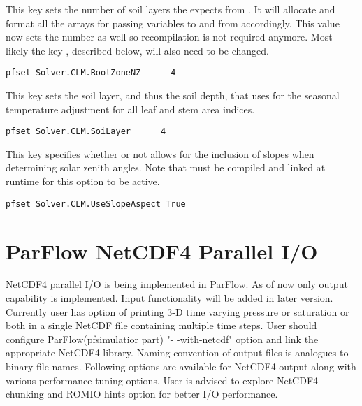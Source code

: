 {This key sets the number of soil layers the \parflow{} expects from
  .  It will allocate and format all the arrays for passing
  variables to and from  accordingly.  This value now sets
  the  number as well so recompilation is not required anymore.
  Most likely the key , described
  below, will also need to be changed.}
\begin{display}\begin{verbatim}
pfset Solver.CLM.RootZoneNZ      4
\end{verbatim}\end{display}

{This key sets the soil layer, and thus the soil depth, that  uses for the seasonal temperature adjustment for all leaf and stem area indices.}
\begin{display}\begin{verbatim}
pfset Solver.CLM.SoiLayer      4
\end{verbatim}\end{display}
{This key specifies whether or not  allows for the inclusion of slopes when determining solar zenith angles.
 Note that  must be compiled and linked at runtime for this option to be active.
}
\begin{display}\begin{verbatim}
pfset Solver.CLM.UseSlopeAspect True
\end{verbatim}\end{display}

\section{ParFlow NetCDF4 Parallel I/O}
\label{ParFlow NetCDF4 Parallel I/O}
NetCDF4 parallel I/O is being implemented in ParFlow. As of now only output capability is implemented. Input functionality will be added in later version. Currently user has option of printing 3-D time varying pressure or saturation or both in a single NetCDF file containing multiple time steps. User should configure ParFlow(pfsimulatior part) "- -with-netcdf" option and link the appropriate NetCDF4 library.
Naming convention of output files is analogues to binary file names. Following options are available for NetCDF4 output along with various performance tuning options. User is advised to explore NetCDF4 chunking and ROMIO hints option for better I/O performance.

